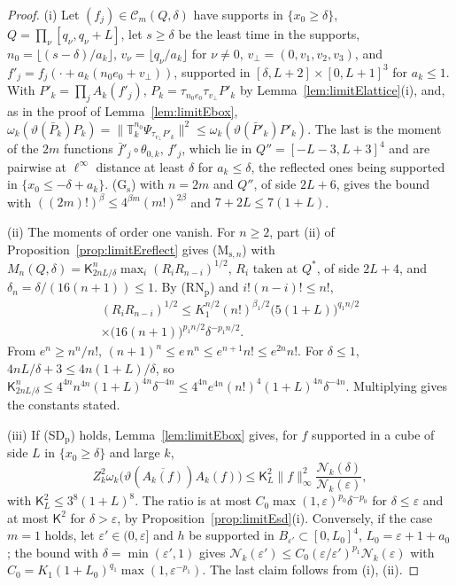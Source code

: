 \documentclass[aps,prd,twocolumn,superscriptaddress,nofootinbib,longbibliography,floatfix,amsmath,amssymb,10pt]{revtex4-2}
\theoremstyle{definition}
\theoremstyle{remark}
\begin{document}
\begin{proof}
(i) Let $(f_j)\in\mathcal C_m(Q,\delta)$ have supports in $\{x_0\ge\delta\}$,
$Q=\prod_\nu[q_\nu,q_\nu+L]$, let $s\ge\delta$ be the least time in the
supports, $n_0=\lfloor(s-\delta)/a_k\rfloor$, $v_\nu=\lfloor q_\nu/a_k\rfloor$
for $\nu\ne0$, $v_\perp=(0,v_1,v_2,v_3)$, and $f'_j=f_j(\cdot+a_k(n_0e_0+
v_\perp))$, supported in $[\delta,L+2]\times[0,L+1]^3$ for $a_k\le1$. With
$P'_k=\prod_jA_k(f'_j)$, $P_k=\tau_{n_0e_0}\tau_{v_\perp}P'_k$ by
Lemma~\ref{lem:limitElattice}(i), and, as in the proof of
Lemma~\ref{lem:limitEbox}, $\omega_k(\vartheta(\bar P_k)P_k)=\|\mathbb
T_k^{n_0}\Psi_{\tau_{v_\perp}P'_k}\|^2\le\omega_k(\vartheta(\bar P'_k)
P'_k)$. The last is the moment of the $2m$ functions $\bar f'_j\circ
\theta_{0,k}$, $f'_j$, which lie in $Q''=[-L-3,L+3]^4$ and are pairwise at
$\ell^\infty$ distance at least $\delta$ for $a_k\le\delta$, the reflected
ones being supported in $\{x_0\le-\delta+a_k\}$. (G$_{\mathrm s}$) with
$n=2m$ and $Q''$, of side $2L+6$, gives the bound with $((2m)!)^\beta\le
4^{\beta m}(m!)^{2\beta}$ and $7+2L\le7(1+L)$.

(ii) The moments of order one vanish. For $n\ge2$, part (ii) of
Proposition~\ref{prop:limitEreflect} gives (M$_{\mathrm s,n}$) with
$M_n(Q,\delta)=\mathsf K_{2nL/\delta}^n\max_i(R_iR_{n-i})^{1/2}$, $R_i$ taken
at $Q^*$, of side $2L+4$, and $\delta_n=\delta/(16(n+1))\le1$. By
(RN$_{\mathrm p}$) and $i!(n-i)!\le n!$,
\begin{multline*}
(R_iR_{n-i})^{1/2}\le K_1^{n/2}(n!)^{\beta_1/2}\bigl(5(1+L)\bigr)^{q_1n/2}\\
\times\bigl(16(n+1)\bigr)^{p_1n/2}\delta^{-p_1n/2} .
\end{multline*}
From $e^n\ge n^n/n!$, $(n+1)^n\le e\,n^n\le e^{n+1}n!\le e^{2n}n!$. For
$\delta\le1$, $4nL/\delta+3\le4n(1+L)/\delta$, so $\mathsf K_{2nL/\delta}^n
\le4^{4n}n^{4n}(1+L)^{4n}\delta^{-4n}\le4^{4n}e^{4n}(n!)^4(1+L)^{4n}
\delta^{-4n}$. Multiplying gives the constants stated.

(iii) If (SD$_{\mathrm p}$) holds, Lemma~\ref{lem:limitEbox} gives, for $f$
supported in a cube of side $L$ in $\{x_0\ge\delta\}$ and large $k$,
\[
Z_k^2\omega_k\bigl(\vartheta(\overline{A_k(f)})A_k(f)\bigr)\le\mathsf K_L^2
\|f\|_\infty^2\frac{\mathcal N_k(\delta)}{\mathcal N_k(\varepsilon)} ,
\]
with $\mathsf K_L^2\le3^8(1+L)^8$. The ratio is at most $C_0\max(1,\varepsilon)^{p_0}
\delta^{-p_0}$ for $\delta\le\varepsilon$ and at most $\mathsf K^2$ for
$\delta>\varepsilon$, by Proposition~\ref{prop:limitEsd}(i). Conversely, if
the case $m=1$ holds, let $\varepsilon'\in(0,\varepsilon]$ and $h$ be
supported in $B_{\varepsilon'}\subset[0,L_0]^4$, $L_0=\varepsilon+1+a_0$;
the bound with $\delta=\min(\varepsilon',1)$ gives $\mathcal
N_k(\varepsilon')\le C_0(\varepsilon/\varepsilon')^{p_1}\mathcal
N_k(\varepsilon)$ with $C_0=K_1(1+L_0)^{q_1}\max(1,\varepsilon^{-p_1})$.
The last claim follows from (i), (ii).
\end{proof}
\end{document}
